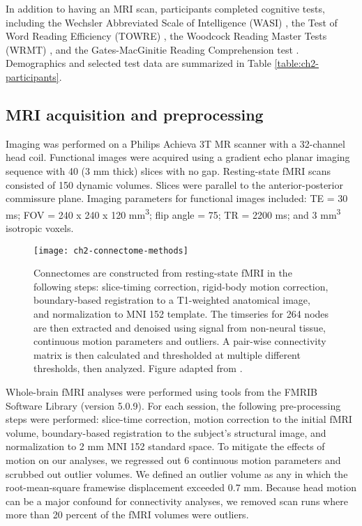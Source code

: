 In addition to having an MRI scan, participants completed cognitive tests, including the Wechsler Abbreviated Scale of Intelligence (WASI) \citep{Kaplan1999}, the Test of Word Reading Efficiency (TOWRE) \citep{Torgesen2012}, the Woodcock Reading Master Tests (WRMT) \citep{Woodcock1998}, and the Gates-MacGinitie Reading Comprehension test \citep{MacGinitie2000}. Demographics and selected test data are summarized in Table \ref{table:ch2-participants}.

\subsection{MRI acquisition and preprocessing}

Imaging was performed on a Philips Achieva 3T MR scanner with a 32-channel head coil. Functional images were acquired using a gradient echo planar imaging sequence with 40 (3 mm thick) slices with no gap. Resting-state fMRI scans consisted of 150 dynamic volumes. Slices were parallel to the anterior-posterior commissure plane. Imaging parameters for functional images included: TE = 30 ms; FOV = 240 x 240 x 120 mm\textsuperscript{3}; flip angle = 75\degree; TR = 2200 ms; and 3 mm\textsuperscript{3} isotropic voxels.

\begin{figure}[t]
    \centering
    \texttt{[image: ch2-connectome-methods]}
    \caption[Schematic for connectome construction.]{Connectomes are constructed from resting-state fMRI in the following steps: slice-timing correction, rigid-body motion correction, boundary-based registration to a T1-weighted anatomical image, and normalization to MNI 152 template. The timseries for 264 nodes are then extracted and denoised using signal from non-neural tissue, continuous motion parameters and outliers. A pair-wise connectivity matrix is then calculated and thresholded at multiple different thresholds, then analyzed. Figure adapted from \citep{Yang2018}.}
    \label{fig:ch2-connectome-methods}
\end{figure}

Whole-brain fMRI analyses were performed using tools from the FMRIB Software Library (version 5.0.9). For each session, the following pre-processing steps were performed:  slice-time correction, motion correction to the initial fMRI volume, boundary-based registration to the subject's structural image, and normalization to 2 mm MNI 152 standard space. To mitigate the effects of motion on our analyses, we regressed out 6 continuous motion parameters and scrubbed out outlier volumes. We defined an outlier volume as any in which the root-mean-square framewise displacement exceeded 0.7 mm. Because head motion can be a major confound for connectivity analyses, we removed scan runs where more than 20 percent of the fMRI volumes were outliers.

